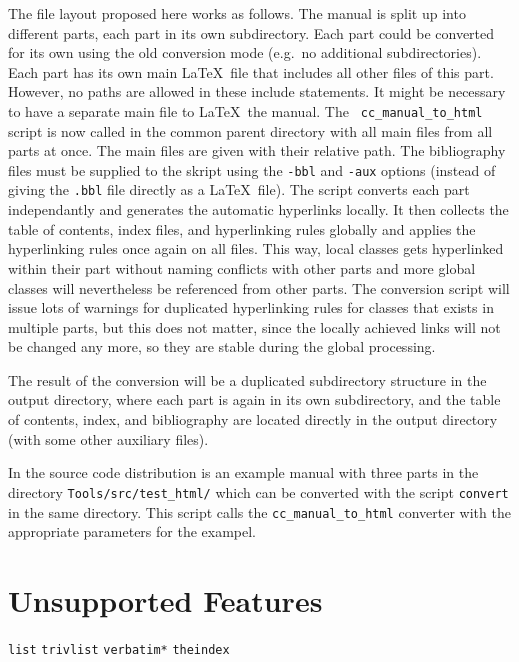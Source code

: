 \documentclass[12pt]{article}
\begin{document}
The file layout proposed here works as follows. The manual is split up
into different parts, each part in its own subdirectory. Each part
could be converted for its own using the old conversion mode (e.g.~no
additional subdirectories). Each part has its own main \LaTeX\ file
that includes all other files of this part. However, no paths are
allowed in these include statements. It might be necessary to have a
separate main file to \LaTeX\ the manual. The {\tt
  cc\_manual\_to\_html} script is now called in the common parent
directory with all main files from all parts at once. The main files
are given with their relative path. The bibliography files must be
supplied to the skript using the {\tt -bbl} and {\tt -aux} options
(instead of giving the {\tt *.bbl} file directly as a \LaTeX\ file).
The script converts each part independantly and generates the
automatic hyperlinks locally. It then collects the table of contents,
index files, and hyperlinking rules globally and applies the
hyperlinking rules once again on all files. This way, local classes
gets hyperlinked within their part without naming conflicts with other
parts and more global classes will nevertheless be referenced from
other parts. The conversion script will issue lots of warnings for
duplicated hyperlinking rules for classes that exists in multiple
parts, but this does not matter, since the locally achieved links will
not be changed any more, so they are stable during the global
processing.

The result of the conversion will be a duplicated subdirectory
structure in the output directory, where each part is again in its own
subdirectory, and the table of contents, index, and bibliography are
located directly in the output directory (with some other auxiliary files).

In the source code distribution is an example manual with three parts
in the directory {\tt Tools/src/test\_html/} which can be converted
with the script {\tt convert} in the same directory. This script calls
the {\tt cc\_manual\_to\_html} converter with the appropriate
parameters for the exampel.

\section{Unsupported Features}

\verb+list+
\verb+trivlist+
\verb+verbatim*+
\verb+theindex+
\verb++
\end{document}
